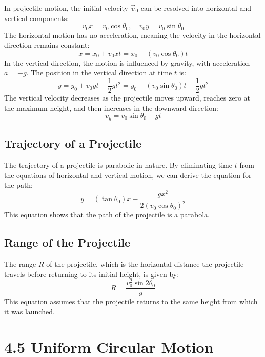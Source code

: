 \documentclass{article}
\begin{document}
In projectile motion, the initial velocity $\vec{v}_0$ can be resolved into horizontal and vertical components:
\[
v_0x = v_0 \cos \theta_0, \quad v_0y = v_0 \sin \theta_0
\]
The horizontal motion has no acceleration, meaning the velocity in the horizontal direction remains constant:
\[
x = x_0 + v_0x t = x_0 + (v_0 \cos \theta_0)t
\]
In the vertical direction, the motion is influenced by gravity, with acceleration $a = -g$. The position in the vertical direction at time $t$ is:
\[
y = y_0 + v_0y t - \frac{1}{2} g t^2 = y_0 + (v_0 \sin \theta_0)t - \frac{1}{2} g t^2
\]
The vertical velocity decreases as the projectile moves upward, reaches zero at the maximum height, and then increases in the downward direction:
\[
v_y = v_0 \sin \theta_0 - g t
\]

\subsection*{Trajectory of a Projectile}

The trajectory of a projectile is parabolic in nature. By eliminating time $t$ from the equations of horizontal and vertical motion, we can derive the equation for the path:
\[
y = ( \tan \theta_0 ) x - \frac{g x^2}{2 (v_0 \cos \theta_0)^2}
\]
This equation shows that the path of the projectile is a parabola.

\subsection*{Range of the Projectile}

The range $R$ of the projectile, which is the horizontal distance the projectile travels before returning to its initial height, is given by:
\[
R = \frac{v_0^2 \sin 2\theta_0}{g}
\]
This equation assumes that the projectile returns to the same height from which it was launched.

\section*{4.5 Uniform Circular Motion}
\end{document}
